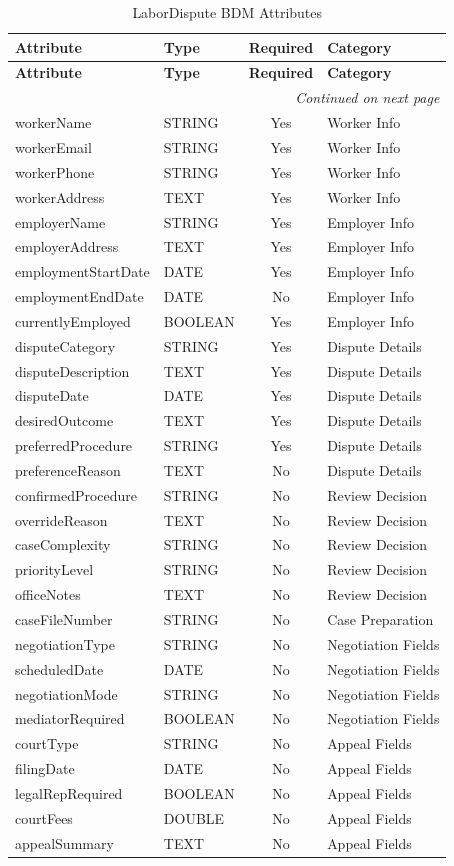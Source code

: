 \documentclass[12pt,a4paper]{article}
\begin{document}
\begin{longtable}{llcp{4cm}}
\caption{LaborDispute BDM Attributes} \label{tab:contest3_bdm} \\
\toprule
\textbf{Attribute} & \textbf{Type} & \textbf{Required} & \textbf{Category} \\
\midrule
\endfirsthead
\toprule
\textbf{Attribute} & \textbf{Type} & \textbf{Required} & \textbf{Category} \\
\midrule
\endhead
\midrule
\multicolumn{4}{r}{\textit{Continued on next page}} \\
\endfoot
\bottomrule
\endlastfoot
workerName & STRING & Yes & Worker Info \\
workerEmail & STRING & Yes & Worker Info \\
workerPhone & STRING & Yes & Worker Info \\
workerAddress & TEXT & Yes & Worker Info \\
employerName & STRING & Yes & Employer Info \\
employerAddress & TEXT & Yes & Employer Info \\
employmentStartDate & DATE & Yes & Employer Info \\
employmentEndDate & DATE & No & Employer Info \\
currentlyEmployed & BOOLEAN & Yes & Employer Info \\
disputeCategory & STRING & Yes & Dispute Details \\
disputeDescription & TEXT & Yes & Dispute Details \\
disputeDate & DATE & Yes & Dispute Details \\
desiredOutcome & TEXT & Yes & Dispute Details \\
preferredProcedure & STRING & Yes & Dispute Details \\
preferenceReason & TEXT & No & Dispute Details \\
confirmedProcedure & STRING & No & Review Decision \\
overrideReason & TEXT & No & Review Decision \\
caseComplexity & STRING & No & Review Decision \\
priorityLevel & STRING & No & Review Decision \\
officeNotes & TEXT & No & Review Decision \\
caseFileNumber & STRING & No & Case Preparation \\
negotiationType & STRING & No & Negotiation Fields \\
scheduledDate & DATE & No & Negotiation Fields \\
negotiationMode & STRING & No & Negotiation Fields \\
mediatorRequired & BOOLEAN & No & Negotiation Fields \\
courtType & STRING & No & Appeal Fields \\
filingDate & DATE & No & Appeal Fields \\
legalRepRequired & BOOLEAN & No & Appeal Fields \\
courtFees & DOUBLE & No & Appeal Fields \\
appealSummary & TEXT & No & Appeal Fields \\
\end{longtable}
\end{document}
